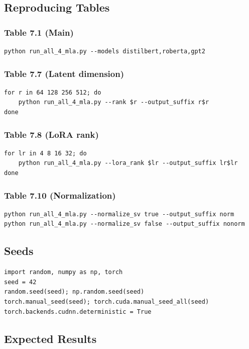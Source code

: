 \subsection{Reproducing Tables}

\subsubsection{Table 7.1 (Main)}
\begin{lstlisting}
python run_all_4_mla.py --models distilbert,roberta,gpt2
\end{lstlisting}

\subsubsection{Table 7.7 (Latent dimension)}
\begin{lstlisting}
for r in 64 128 256 512; do
    python run_all_4_mla.py --rank $r --output_suffix r$r
done
\end{lstlisting}

\subsubsection{Table 7.8 (LoRA rank)}
\begin{lstlisting}
for lr in 4 8 16 32; do
    python run_all_4_mla.py --lora_rank $lr --output_suffix lr$lr
done
\end{lstlisting}

\subsubsection{Table 7.10 (Normalization)}
\begin{lstlisting}
python run_all_4_mla.py --normalize_sv true --output_suffix norm
python run_all_4_mla.py --normalize_sv false --output_suffix nonorm
\end{lstlisting}

\subsection{Seeds}

\begin{lstlisting}
import random, numpy as np, torch
seed = 42
random.seed(seed); np.random.seed(seed)
torch.manual_seed(seed); torch.cuda.manual_seed_all(seed)
torch.backends.cudnn.deterministic = True
\end{lstlisting}

\subsection{Expected Results}

